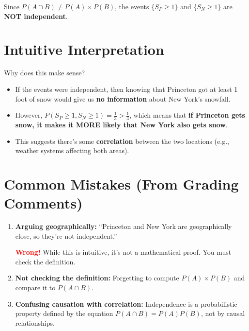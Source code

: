\documentclass[11pt]{article}
\begin{document}
\begin{tcolorbox}[colback=red!10, colframe=red!50!black, title=Answer]
Since $P(A \cap B) \neq P(A) \times P(B)$, the events $\{S_P \geq 1\}$ and $\{S_N \geq 1\}$ are \textbf{NOT independent}.
\end{tcolorbox}

\section*{Intuitive Interpretation}

Why does this make sense?

\begin{itemize}
    \item If the events were independent, then knowing that Princeton got at least 1 foot of snow would give us \textbf{no information} about New York's snowfall.

    \item However, $P(S_P \geq 1, S_N \geq 1) = \frac{1}{3} > \frac{1}{4}$, which means that \textbf{if Princeton gets snow, it makes it MORE likely that New York also gets snow}.

    \item This suggests there's some \textbf{correlation} between the two locations (e.g., weather systems affecting both areas).
\end{itemize}

\section*{Common Mistakes (From Grading Comments)}

\begin{enumerate}
    \item \textbf{Arguing geographically:} ``Princeton and New York are geographically close, so they're not independent.''

    \textcolor{red}{\textbf{Wrong!}} While this is intuitive, it's not a mathematical proof. You must check the definition.

    \item \textbf{Not checking the definition:} Forgetting to compute $P(A) \times P(B)$ and compare it to $P(A \cap B)$.

    \item \textbf{Confusing causation with correlation:} Independence is a probabilistic property defined by the equation $P(A \cap B) = P(A)P(B)$, not by causal relationships.
\end{enumerate}
\end{document}
